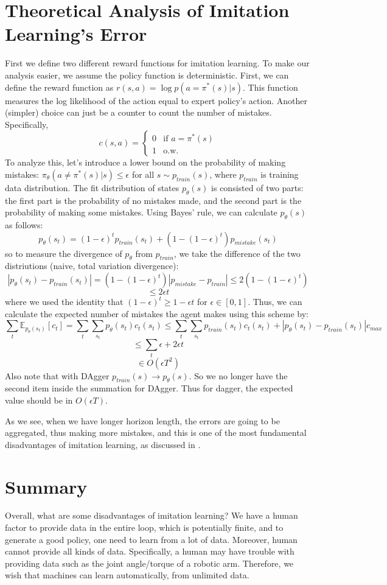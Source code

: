 \section{Theoretical Analysis of Imitation Learning's Error}
First we define two different reward functions for imitation learning. To make our analysis easier, we assume the policy function is deterministic. First, we can define the reward function as $r(s,a)=\log p(a=\pi^*(s)|s)$. This function measures the log likelihood of the action equal to expert policy's action. Another (simpler) choice can just be a counter to count the number of mistakes. Specifically, 
\[ c(s,a) = \begin{cases} 
          0 & \text{if } a = \pi^*(s) \\
          1 & \text{o.w.}
       \end{cases}
    \]
To analyze this, let's introduce a lower bound on the probability of making mistakes: $\pi_\theta(a\neq \pi^*(s)|s)\leq \epsilon$ for all $s\sim p_{train}(s)$, where $p_{train}$ is training data distribution. The fit distribution of states $p_\theta(s)$ is consisted of two parts: the first part is the probability of no mistakes made, and the second part is the probability of making some mistakes. Using Bayes' rule, we can calculate $p_\theta(s)$ as follows:
$$p_\theta(s_t) = (1-\epsilon)^tp_{train}(s_t)+(1-(1-\epsilon)^t)p_{mistake}(s_t)$$
so to measure the divergence of $p_\theta$ from $p_{train}$, we take the difference of the two distriutions (naive, total variation divergence):
$$|p_\theta(s_t)-p_{train}(s_t)|=(1-(1-\epsilon)^t)|p_{mistake}-p_{train}|\leq2(1-(1-\epsilon)^t)$$
$$\leq 2\epsilon t$$
where we used the identity that $(1-\epsilon)^t\geq1-\epsilon t$ for $\epsilon\in [0,1]$. Thus, we can calculate the expected number of mistakes the agent makes using this scheme by:
$$\sum_t\mathbb{E}_{p_\theta(s_t)}[c_t] = \sum_t\sum_{s_t}p_\theta(s_t)c_t(s_t)\leq\sum_t\sum_{s_t}p_{train}(s_t)c_t(s_t)+|p_\theta(s_t)-p_{train}(s_t)|c_{max}$$
$$\leq\sum_t\epsilon+2\epsilon t$$
$$\in O(\epsilon T^2)$$
Also note that with DAgger $p_{train}(s)\rightarrow p_\theta(s)$. So we no longer have the second item inside the summation for DAgger. Thus for dagger, the expected value should be in $O(\epsilon T)$.

As we see, when we have longer horizon length, the errors are going to be aggregated, thus making more mistakes, and this is one of the most fundamental disadvantages of imitation learning, as discussed in \cite{ross2011reduction}.
\section{Summary}
Overall, what are some disadvantages of imitation learning? We have a human factor to provide data in the entire loop, which is potentially finite, and to generate a good policy, one need to learn from a lot of data. Moreover, human cannot provide all kinds of data. Specifically, a human may have trouble with providing data such as the joint angle/torque of a robotic arm. Therefore, we wish that machines can learn automatically, from unlimited data.
